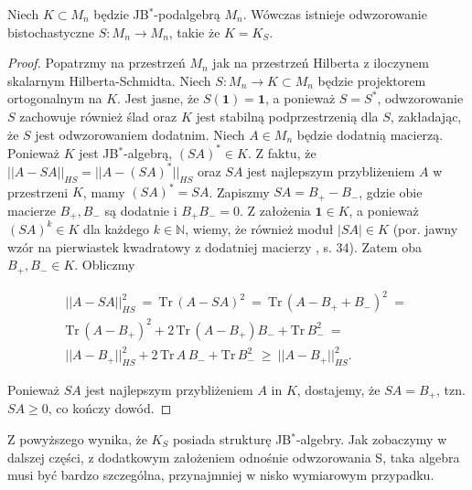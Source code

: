 {\begin{Theorem}
\label{thm:FromESbook}
Niech $K \subset M_{n}$ będzie JB$^{*}$-podalgebrą $M_{n}$.
Wówczas istnieje odwzorowanie bistochastyczne
$S \! : M_{n} \rightarrow M_{n}$, takie że $K = K_{S}$.
\end{Theorem}
\begin{proof}
Popatrzmy na przestrzeń $M_{n}$ jak na przestrzeń Hilberta z iloczynem skalarnym
Hilberta-Schmidta.
Niech $S\!: M_{n} \rightarrow K \subset M_{n}$ będzie
projektorem ortogonalnym na $K$.
Jest jasne, że $S(\mathbf{1}) = \mathbf{1}$,
a ponieważ $S = S^{*}$,
odwzorowanie $S$ zachowuje również ślad oraz
$K$ jest stabilną podprzestrzenią dla $S$,
zakładając, że $S$ jest odwzorowaniem dodatnim.
Niech $A \in M_{n}$  będzie dodatnią macierzą.
Ponieważ $K$ jest JB$^{*}$-algebrą,
$(SA)^{*} \in K$.
Z faktu, że
$|| A - SA ||_{HS} = || A - (SA)^{*} ||_{HS}$
oraz $SA$ jest najlepszym przybliżeniem $A$ w przestrzeni $K$,
mamy $(SA)^{*} = SA$.
Zapiszmy $SA = B_{+} - B_{-}$,
gdzie obie macierze $B_{+}, B_{-}$ są dodatnie i
$B_{+} B_{-} = 0$.
Z założenia $\mathbf{1} \in K$,
a ponieważ $(SA)^{k} \in K$ dla każdego $k \in \mathbb{N}$,
wiemy, że również moduł $|S A| \in K$
(por. jawny wzór na pierwiastek kwadratowy z dodatniej macierzy
\cite{Bratteli2003}, s. 34).
Zatem oba $B_{+}, B_{-} \in K$.
Obliczmy
\begin{linenomath*}
 \begin{multline}
|| A - SA ||_{HS}^{2} \: = \: \text{Tr} \, ( A - SA )^{2} \: = \:
    \text{Tr} \, ( A - B_{+} + B_{-} )^{2} \: = \: \\
    \text{Tr} \, ( A - B_{+} )^{2} +
        2 \, \text{Tr} \, ( A - B_{+} ) B_{-} + \text{Tr} \, B_{-}^{2}
            \: = \: \\
    || A - B_{+} ||_{HS}^{2} +
        2 \, \text{Tr} \,  A \, B_{-}+ \text{Tr} \, B_{-}^{2}
    \: \geq \: || A - B_{+} ||_{HS}^{2}.
 \end{multline}
\end{linenomath*}
Ponieważ $SA$ jest najlepszym przybliżeniem $A$ in $K$,
dostajemy, że $SA = B_{+}$, tzn. $SA \geq 0$, co kończy dowód.
\end{proof}


Z powyższego wynika, że $K_{S}$ posiada strukturę JB$^{*}$-algebry.
Jak zobaczymy w dalszej części,
z dodatkowym założeniem odnośnie odwzorowania S,
taka algebra musi być bardzo szczególna,
przynajmniej w nisko wymiarowym przypadku.

}
